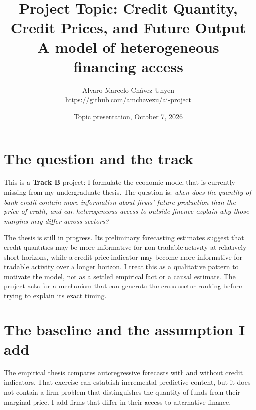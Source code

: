 \documentclass[11pt]{article}
\title{Project Topic: Credit Quantity, Credit Prices, and Future Output\\
\large A model of heterogeneous financing access}
\author{Alvaro Marcelo Ch\'avez Unyen\\
\small\url{https://github.com/amchavezu/ai-project}}
\date{Topic presentation, October 7, 2026}
\begin{document}
\maketitle

\section{The question and the track}

This is a \textbf{Track B} project: I formulate the economic model that is
currently missing from my undergraduate thesis. The question is: \emph{when
does the quantity of bank credit contain more information about firms' future
production than the price of credit, and can heterogeneous access to outside
finance explain why those margins may differ across sectors?}

The thesis is still in progress. Its preliminary forecasting estimates suggest
that credit quantities may be more informative for non-tradable activity at
relatively short horizons, while a credit-price indicator may become more
informative for tradable activity over a longer horizon. I treat this as a
qualitative pattern to motivate the model, not as a settled empirical fact or a
causal estimate. The project asks for a mechanism that can generate the
cross-sector ranking before trying to explain its exact timing.

\section{The baseline and the assumption I add}

The empirical thesis compares autoregressive forecasts with and without credit
indicators. That exercise can establish incremental predictive content, but it
does not contain a firm problem that distinguishes the quantity of funds from
their marginal price. I add firms that differ in their access to alternative
finance.
\end{document}
